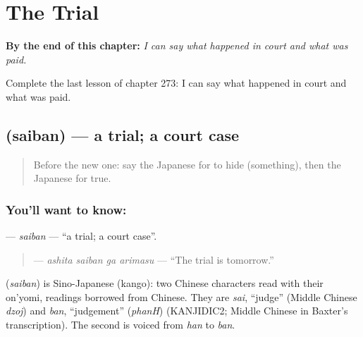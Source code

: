 
\chapter{The Trial}
\label{ch:ja-the-trial}

\begin{chapteropening}
\textbf{By the end of this chapter:} \emph{I can say what happened in court and what was paid.}

Complete the last lesson of chapter 273: I can say what happened in court and what was paid.
\end{chapteropening}

\section[\texorpdfstring{\ja{さいばん} (saiban)}{さいばん (saiban)}]{ (saiban) — a trial; a court case}

\label{lesson:JA-C273-saiban}



\begin{quote}
Before the new one: say the Japanese for to hide (something), then the Japanese for true.
\end{quote}

\subsection*{You'll want to know: }
\textbf{} — \emph{saiban} — \textquotedblleft{}a trial; a court case\textquotedblright{}.

\begin{quote}
\textbf{  } — \emph{ashita saiban ga arimasu} — \textquotedblleft{}The trial is tomorrow.\textquotedblright{}
\end{quote}

\begin{cousinweb}
\textbf{} (\emph{saiban}) is Sino-Japanese (kango): two Chinese characters read with their on'yomi, readings borrowed from Chinese. They are \emph{sai}, \textquotedblleft{}judge\textquotedblright{} (Middle Chinese \emph{dzoj}) and \emph{ban}, \textquotedblleft{}judgement\textquotedblright{} (\emph{phanH}) (KANJIDIC2; Middle Chinese in Baxter's transcription). The second is voiced from \emph{han} to \emph{ban}.
\end{cousinweb}

